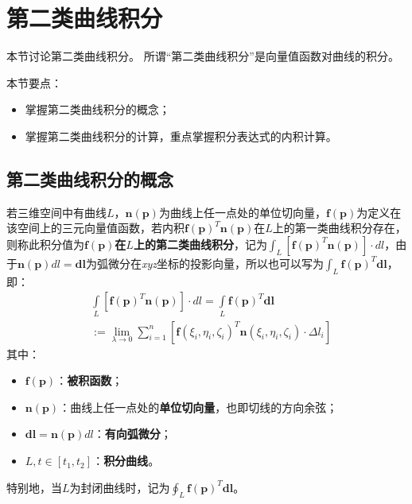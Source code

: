 \section{第二类曲线积分}

本节讨论第二类曲线积分。
所谓“第二类曲线积分”是向量值函数对曲线的积分。

本节要点：
\begin{itemize}
    \item 掌握第二类曲线积分的概念；
    \item 掌握第二类曲线积分的计算，重点掌握积分表达式的内积计算。
\end{itemize}

\subsection{第二类曲线积分的概念}

\begin{definition}[第二类曲线积分]
若三维空间中有曲线$L$，$\mathbf{n}\left( \boldsymbol{p} \right) $为曲线上任一点处的单位切向量，$\boldsymbol{f}\left( \boldsymbol{p} \right) $为定义在该空间上的三元向量值函数，若内积$\boldsymbol{f}\left( \boldsymbol{p} \right) ^T\mathbf{n}\left( \boldsymbol{p} \right) $在$L$上的第一类曲线积分存在，则称此积分值为{\bf $\boldsymbol{f}\left( \boldsymbol{p} \right) $在$L$上的第二类曲线积分}，记为$\int_L{\left[ \boldsymbol{f}\left( \boldsymbol{p} \right) ^T\mathbf{n}\left( \boldsymbol{p} \right) \right] \cdot dl}$，由于$\mathbf{n}\left( \boldsymbol{p} \right) dl=\boldsymbol{dl}$为弧微分在{\it xyz}坐标的投影向量，所以也可以写为$\int_L{\boldsymbol{f}\left( \boldsymbol{p} \right) ^T\boldsymbol{dl}}$，即：
\begin{align*}
&\int\limits_L{\left[ \boldsymbol{f}\left( \boldsymbol{p} \right) ^T\mathbf{n}\left( \boldsymbol{p} \right) \right] \cdot dl}=\int\limits_L{\boldsymbol{f}\left( \boldsymbol{p} \right) ^T\boldsymbol{dl}} \\
&:=\underset{\lambda \rightarrow 0}{\lim}\sum_{i=1}^n{\left[ \boldsymbol{f}\left( \xi _i,\eta _i,\zeta _i \right) ^T\mathbf{n}\left( \xi _i,\eta _i,\zeta _i \right) \cdot \Delta l_i \right]}
\end{align*}
其中：
\begin{itemize}
    \item $\boldsymbol{f}\left( \boldsymbol{p} \right) $：{\bf 被积函数}；
    \item $\mathbf{n}\left( \boldsymbol{p} \right) $：曲线上任一点处的{\bf 单位切向量}，也即切线的方向余弦；
    \item $\boldsymbol{dl}=\mathbf{n}\left( \boldsymbol{p} \right) dl$：{\bf 有向弧微分}；
    \item $L,t\in \left[ t_1,t_2 \right] $：{\bf 积分曲线}。
\end{itemize}
特别地，当$L$为封闭曲线时，记为$\oint_L{\boldsymbol{f}\left( \boldsymbol{p} \right) ^T\boldsymbol{dl}}$。
\end{definition}

